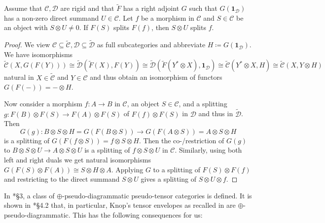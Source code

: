 \documentclass[11pt]{amsart}
\newcommand\Cref[1]{\zcref[S]{#1}}
\theoremstyle{definition}
\theoremstyle{remark}
\newcommand\cC{\mathcal C}
\newcommand\cD{\mathcal D}
\renewcommand\:\colon
\renewcommand\o\otimes
\newcommand\one{\mathbf{1}}
\renewcommand\o\otimes
\renewcommand\:\colon
\begin{document}
\begin{lemma} \label{l:adjoint-preserves-splitting-objects}
    Assume that $\cC, \cD$ are rigid and that $\tilde{F}$ has a right adjoint $G$ such that $G(\one_\cD)$ has a non-zero direct summand $U \in \cC$. Let $f$ be a morphism in $\cC$ and $S \in \cC$ be an object with $S\o U\ne0$. If $F(S)$ splits $F(f)$, then $S \o U$ splits $f$.
\end{lemma}
\begin{proof}
    We view $\cC \subseteq \tilde{\cC}, \cD \subseteq \tilde{\cD}$ as full subcategories and abbreviate $H \coloneqq G(\one_\cD)$. We have isomorphisms
    \[
        \tilde{\cC}(X, G(F(Y))) \cong \tilde{\cD}(\tilde{F}(X), F(Y)) \cong \tilde{\cD}(\tilde{F}(Y^* \o X), \one_\cD) \cong \tilde{\cC}(Y^* \o X, H) \cong \tilde{\cC}(X, Y \o H)
    \]
    natural in $X \in \tilde{\cC}$ and $Y \in \cC$ and thus obtain an isomorphism of functors $G(F(-)) = - \o H$.
    
    Now consider a morphism $f: A \to B$ in $\cC$, an object $S \in \cC$, and a splitting $g: F(B) \otimes F(S) \to F(A) \o F(S)$ of $F(f)\o F(S)$ in $\cD$ and thus in $\tilde{\cD}$. Then
    \[
        G(g): B \o S \o H = G(F(B \o S)) \longrightarrow G(F(A \o S)) = A \o S \o H
    \]
    is a splitting of $G(F(f\o S)) = f \o S \o H$. Then the co-/restriction of $G(g)$ to $B \o S \o U \to A \o S \o U$ is a splitting of $f\o S\o U$ in $\cC$. Similarly, using both left and right duals we get natural isomorphisms $G(F(S)\o F(A))\cong S\o H\o A$. Applying $G$ to a splitting of $F(S)\o F(f)$ and restricting to the direct summand $S\o U$ gives a splitting of $S\o U\o f$.
\end{proof}

In \cite{flake2026monoidaladjunctionsabelianenvelopes}*{\S 3}, a class of $\oplus$-pseudo-diagrammatic pseudo-tensor categories is defined. It is shown in \cite{flake2026monoidaladjunctionsabelianenvelopes}*{\S 4.2} that, in particular, Knop's tensor envelopes as recalled in \Cref{bg:knop} are $\oplus$-pseudo-diagrammatic. This has the following consequences for us:

\end{document}
